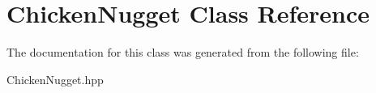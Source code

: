 \hypertarget{class_chicken_nugget}{}\section{Chicken\+Nugget Class Reference}
\label{class_chicken_nugget}


The documentation for this class was generated from the following file\+:\begin{DoxyCompactItemize}
\item 
Chicken\+Nugget.\+hpp\end{DoxyCompactItemize}
